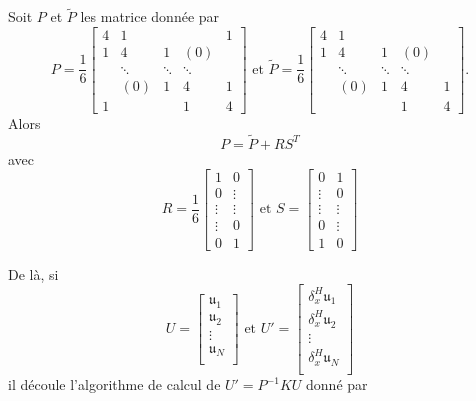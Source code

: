 \begin{proposition}
Soit $P$ et $\tilde{P}$ les matrice donnée par 
\begin{equation}
P = \dfrac{1}{6} 
\begin{bmatrix}
4 & 1 &   &   & 1 \\ 
1 & 4 & 1 & (0) &   \\ 
  & \ddots & \ddots & \ddots &   \\ 
  & (0) & 1 & 4 & 1 \\ 
1 &   &  & 1 & 4
\end{bmatrix} \text{ et }
\tilde{P} = \dfrac{1}{6} 
\begin{bmatrix}
4 & 1 &   &   &  \\ 
1 & 4 & 1 & (0) &   \\ 
  & \ddots & \ddots & \ddots &   \\ 
  & (0) & 1 & 4 & 1 \\ 
 &   &  & 1 & 4
\end{bmatrix}.
\end{equation}
Alors 
\begin{equation}
P = \tilde{P} + R S^T
\end{equation} 
avec 
\begin{equation}
R = \dfrac{1}{6}\begin{bmatrix}
1 & 0 \\ 
0 & \vdots \\ 
\vdots & \vdots \\ 
\vdots & 0 \\ 
0 & 1
\end{bmatrix} \text{ et } 
S = \begin{bmatrix}
0 & 1 \\ 
\vdots & 0 \\ 
\vdots & \vdots \\ 
0 & \vdots \\ 
1 & 0
\end{bmatrix} 
\end{equation}
\end{proposition}

De là, si 
\begin{equation}
U = \begin{bmatrix}
\mathfrak{u}_1 \\
\mathfrak{u}_2 \\
\vdots \\
\mathfrak{u}_N \\
\end{bmatrix} \text{ et } 
U' = \begin{bmatrix}
\delta_x^H\mathfrak{u}_1 \\
\delta_x^H\mathfrak{u}_2 \\
\vdots \\
\delta_x^H\mathfrak{u}_N \\
\end{bmatrix}
\end{equation}
il découle l'algorithme de calcul de $U' = P^{-1}K U$ donné par

